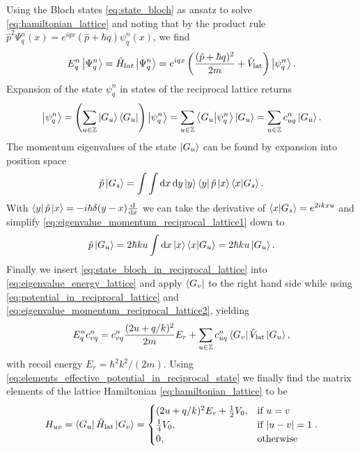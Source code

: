 Using the Bloch states \cref{eq:state_bloch} as ansatz to solve
\cref{eq:hamiltonian_lattice} and noting that by the product rule
$\hat{p}^2\Psi^n_q(x)=e^{iqx}(\hat{p}+\hbar q)\psi^n_q(x)$, we find
\begin{equation}
  E^n_q\ket{\Psi^n_{q}}
  =\hat{H}_{lat}\ket{\Psi^n_{q}}
  =e^{iqx}\left(\frac{(\hat{p}+\hbar q)^2}{2m}+\hat{V}_\text{lat}\right)\ket{\psi^n_{q}}
  \label{eq:eigenvalue_energy_lattice}.
\end{equation}
Expansion of the state $\psi^n_q$ in states of the reciprocal lattice returns
\begin{equation}
  \ket{\psi^n_q}
  =\left(\sum_{u\in\mathbb{Z}}\ket{G_u}\bra{G_u}\right)\ket{\psi^n_q}
  =\sum_{u\in\mathbb{Z}}\braket{G_u}{\psi^n_q}\ket{G_u}
  =\sum_{u\in\mathbb{Z}}c^n_{uq}\ket{G_u}
  \label{eq:state_bloch_in_reciprocal_lattice}.
\end{equation}
The momentum eigenvalues of the state $\ket{G_u}$ can be found by expansion
into position space
\begin{equation}
  \hat{p}\ket{G_s}
  =\int\int\dd{x}\dd{y}\ket{y}\bra{y}\hat{p}\ket{x}\bra{x}\ket{G_s}
  \label{eq:eigenvalue_momentum_reciprocal_lattice1}.
\end{equation}
With $\bra{y}\hat{p}\ket{x}=-i\hbar\delta(y-x)\dv{x}$ we can take the
derivative of $\bra{x}\ket{G_s}=e^{2ikxu}$ and simplify
\cref{eq:eigenvalue_momentum_reciprocal_lattice1} down to
\begin{equation}
  \hat{p}\ket{G_u}
  =2\hbar ku\int\dd{x}\ket{x}\bra{x}\ket{G_u}
  =2\hbar ku\ket{G_u}
  \label{eq:eigenvalue_momentum_reciprocal_lattice2}.
\end{equation}
Finally we insert \cref{eq:state_bloch_in_reciprocal_lattice} into
\cref{eq:eigenvalue_energy_lattice} and apply $\bra{G_v}$ to the
right hand side while using \cref{eq:potential_in_reciprocal_lattice} and
\cref{eq:eigenvalue_momentum_reciprocal_lattice2}, yielding
\begin{equation}
  E^n_qc^n_{vq}
  =c^n_{vq}
  \frac{(2u+q/k)^2}{2m}E_r+
  \sum_{u\in\mathbb{Z}}c^n_{uq}\bra{G_v}\hat{V}_\text{lat}\ket{G_u},
  \label{eq:eigenvalue_energy_lattice_explicit}
\end{equation}
with recoil energy $E_r=\hbar^2k^2/(2m)$. Using
\cref{eq:elements_effective_potential_in_reciprocal_state} we finally find the
matrix elements of the lattice Hamiltonian \cref{eq:hamiltonian_lattice} to be
\begin{equation}
  H_{uv}
  =\bra{G_u}\hat{H}_\text{lat}\ket{G_v}
  =\begin{cases}
    (2u+q/k)^2E_r+\frac{1}{2}V_0, & \text{if }u=v\\
    \frac{1}{4}V_0, & \text{if } \abs{u-v}=1\\
    0, & \text{otherwise}
  \end{cases}
  \label{eq:hamiltonian_effective_elements}.
\end{equation}
